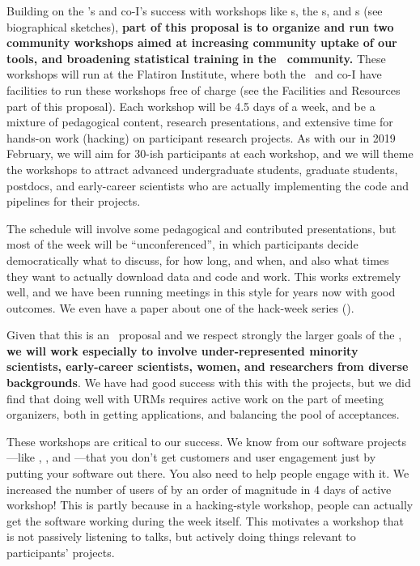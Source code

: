 \documentclass[12pt, letterpaper]{article}
\begin{document}
Building on the \PI's and co-I's success with workshops like
s, the s,
 and s
(see biographical sketches), \textbf{part of this proposal is to organize and
run two community workshops aimed at increasing community uptake of our
tools, and broadening statistical training in the \EPRV\ community.}
These workshops will run at the Flatiron Institute, where both the
\PI\ and co-I have facilities to run these workshops free of charge
(see the Facilities and Resources part of this proposal).
Each workshop will be 4.5 days of a week, and be a mixture of
pedagogical content, research presentations, and extensive time for
hands-on work (hacking) on participant research projects.
As with our  in 2019 February, we
will aim for 30-ish participants at each workshop, and we will theme
the workshops to attract advanced undergraduate students, graduate
students, postdocs, and early-career scientists who are actually
implementing the code and pipelines for their projects.

The schedule will involve some pedagogical and contributed presentations,
but most of the week will be ``unconferenced'', in which participants
decide democratically what to discuss, for how long, and when, and also
what times they want to actually download data and code and work.
This works extremely well, and we have been running meetings in this 
style for years now with good outcomes.
We even have a paper about one of the hack-week series (\citealt{AHW}).

Given that this is an \NSF\ proposal and we respect strongly the larger
goals of the \NSF, \textbf{we will work especially to involve
under-represented minority scientists, early-career scientists, women, 
and researchers from diverse backgrounds}.
We have had good success with this with the  projects,
but we did find that doing well with URMs requires active work on the part
of meeting organizers, both in getting applications, and balancing the pool
of acceptances.

These workshops are critical to our success.
We know from our software projects---like ,
, and ---that you don't get customers
and user engagement just by putting your software out there.
You also need to help people engage with it.
We increased the number of users of  by an order of
magnitude in 4 days of active workshop!
This is partly because in a hacking-style workshop, people can actually
get the software working during the week itself.
This motivates a workshop that is not passively listening to talks, but actively
doing things relevant to participants' projects.
\end{document}
